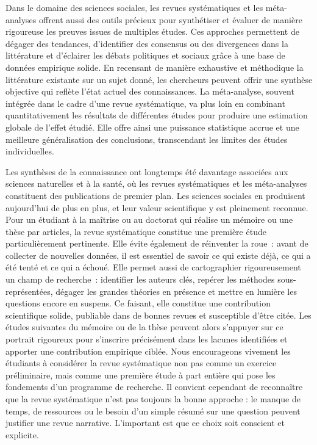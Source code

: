 \documentclass[
  letterpaper,
  DIV=11,
  numbers=noendperiod,
  oneside]{scrreprt}
\begin{document}
Dans le domaine des sciences sociales, les revues systématiques et les
méta-analyses offrent aussi des outils précieux pour synthétiser et
évaluer de manière rigoureuse les preuves issues de multiples études.
Ces approches permettent de dégager des tendances, d'identifier des
consensus ou des divergences dans la littérature et d'éclairer les
débats politiques et sociaux grâce à une base de données empirique
solide. En recensant de manière exhaustive et méthodique la littérature
existante sur un sujet donné, les chercheurs peuvent offrir une synthèse
objective qui reflète l'état actuel des connaissances. La méta-analyse,
souvent intégrée dans le cadre d'une revue systématique, va plus loin en
combinant quantitativement les résultats de différentes études pour
produire une estimation globale de l'effet étudié. Elle offre ainsi une
puissance statistique accrue et une meilleure généralisation des
conclusions, transcendant les limites des études individuelles.

Les synthèses de la connaissance ont longtemps été davantage associées
aux sciences naturelles et à la santé, où les revues systématiques et
les méta-analyses constituent des publications de premier plan. Les
sciences sociales en produisent aujourd'hui de plus en plus, et leur
valeur scientifique y est pleinement reconnue. Pour un étudiant à la
maîtrise ou au doctorat qui réalise un mémoire ou une thèse par
articles, la revue systématique constitue une première étude
particulièrement pertinente. Elle évite également de réinventer la
roue~: avant de collecter de nouvelles données, il est essentiel de
savoir ce qui existe déjà, ce qui a été tenté et ce qui a échoué. Elle
permet aussi de cartographier rigoureusement un champ de recherche~:
identifier les auteurs clés, repérer les méthodes sous-représentées,
dégager les grandes théories en présence et mettre en lumière les
questions encore en suspens. Ce faisant, elle constitue une contribution
scientifique solide, publiable dans de bonnes revues et susceptible
d'être citée. Les études suivantes du mémoire ou de la thèse peuvent
alors s'appuyer sur ce portrait rigoureux pour s'inscrire précisément
dans les lacunes identifiées et apporter une contribution empirique
ciblée. Nous encourageons vivement les étudiants à considérer la revue
systématique non pas comme un exercice préliminaire, mais comme une
première étude à part entière qui pose les fondements d'un programme de
recherche. Il convient cependant de reconnaître que la revue
systématique n'est pas toujours la bonne approche : le manque de temps,
de ressources ou le besoin d'un simple résumé sur une question peuvent
justifier une revue narrative. L'important est que ce choix soit
conscient et explicite.
\end{document}
